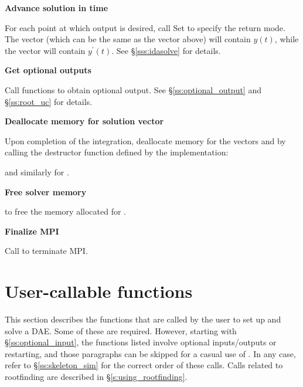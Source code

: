 \begin{Steps}
\item
  {\bf Advance solution in time}

  For each point at which output is desired, call
  Set  to specify the return mode.
  The vector  (which can be the same as
  the vector  above) will contain $y(t)$,
  while the vector  will contain $y^\prime(t)$.
  See \S\ref{sss:idasolve} for details.
  
\item
  {\bf Get optional outputs}

  Call  functions to obtain optional output.
  See \S\ref{ss:optional_output} and \S\ref{ss:root_uc} for details.

\item
  {\bf Deallocate memory for solution vector}

  Upon completion of the integration, deallocate memory for the vectors 
  and  by calling the destructor function defined by the {\nvector} 
  implementation:

  {\s} 

  {\p} 
  
  and similarly for .
  
\item
  {\bf Free solver memory}

   to free the memory allocated for {\ida}.
  
\item 
  {\bf {\p} Finalize MPI}
  
  Call  to terminate MPI.

\end{Steps}

\section{User-callable functions}
\label{ss:ida_fct_sim}

This section describes the {\ida} functions that are called by the
user to set up and solve a DAE. Some of these are required. However,
starting with \S\ref{ss:optional_input}, the functions listed involve
optional inputs/outputs or restarting, and those paragraphs can be
skipped for a casual use of {\ida}. In any case, refer to
\S\ref{ss:skeleton_sim} for the correct order of these calls.
Calls related to rootfinding are described in \S\ref{s:using_rootfinding}.

